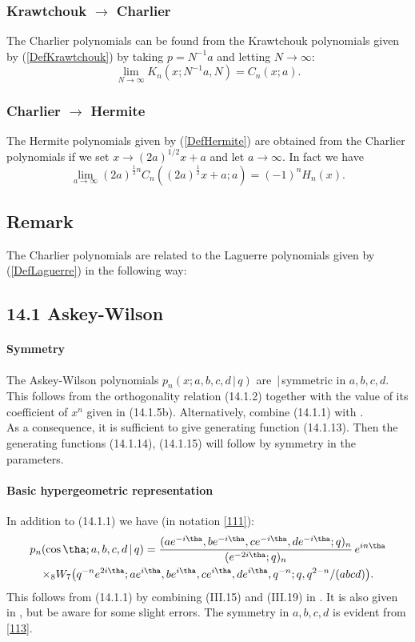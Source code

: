\documentclass[envcountchap,graybox]{svmono}
\newcounter{rom}
\begin{document}
\subsubsection*{Krawtchouk $\rightarrow$ Charlier}
The Charlier polynomials can be found from the Krawtchouk polynomials given by
(\ref{DefKrawtchouk}) by taking $p=N^{-1}a$ and letting $N\rightarrow\infty$:
$$\lim_{N\rightarrow\infty}K_n(x;N^{-1}a,N)=C_n(x;a).$$

\subsubsection*{Charlier $\rightarrow$ Hermite}
The Hermite polynomials given by (\ref{DefHermite}) are obtained from the Charlier polynomials
if we set $x\rightarrow (2a)^{1/2}x+a$ and let $a\rightarrow\infty$. In fact we have
\begin{equation}
\lim_{a\rightarrow\infty}
(2a)^{\frac{1}{2}n}C_n((2a)^{\frac{1}{2}}x+a;a)=(-1)^nH_n(x).
\end{equation}

\subsection*{Remark}
The Charlier polynomials are related to the Laguerre polynomials given by (\ref{DefLaguerre})
in the following way:
\subsection*{14.1 Askey-Wilson}
\label{sec14.1}
%
\paragraph{Symmetry}
The Askey-Wilson polynomials $p_n(x;a,b,c,d\,|\,q)$ are \,|\,symmetric
in $a,b,c,d$.
\sLP
This follows from the orthogonality relation (14.1.2)
together with the value of its coefficient of $x^n$ given in (14.1.5b).
Alternatively, combine (14.1.1) with .\\
As a consequence, it is sufficient to give generating function (14.1.13). Then the generating
functions (14.1.14), (14.1.15) will follow by symmetry in the parameters.
%
\paragraph{Basic hypergeometric representation}
In addition to (14.1.1) we have (in notation \eqref{111}):
\begin{multline}
p_n(\cos\tha;a,b,c,d\,|\, q)
=\frac{(ae^{-i\tha},be^{-i\tha},ce^{-i\tha},de^{-i\tha};q)_n}
{(e^{-2i\tha};q)_n}\,e^{in\tha}\\
\times {}_8W_7\big(q^{-n}e^{2i\tha};ae^{i\tha},be^{i\tha},
ce^{i\tha},de^{i\tha},q^{-n};q,q^{2-n}/(abcd)\big).
\label{113}
\end{multline}
This follows from (14.1.1) by combining (III.15) and (III.19) in
.
It is also given in , but be aware for some slight errors.
The symmetry in $a,b,c,d$ is evident from \eqref{113}.
%
\end{document}
